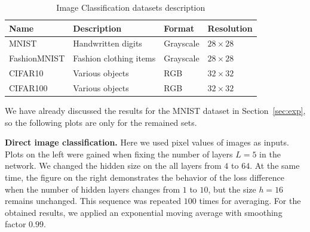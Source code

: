 \documentclass{article}
\begin{document}
\begin{table}[ht]
  \caption{Image Classification datasets description}
  \label{table:datasets}
  \centering
  \begin{tabular}{llll}
    \toprule
    Name     & Description     & Format & Resolution \\
    \midrule
    MNIST \cite{deng2012mnist} & Handwritten digits & Grayscale & $28 \times 28$ \\
    FashionMNIST \cite{xiao2017fashionmnistnovelimagedataset} & Fashion clothing items & Grayscale & $28 \times 28$ \\
    CIFAR10 \cite{krizhevsky2009learning} & Various objects & RGB & $32\times 32$ \\
    CIFAR100 \cite{krizhevsky2009learning} & Various objects & RGB & $32 \times 32$ \\
    \bottomrule
  \end{tabular}
\end{table}

We have already discussed the results for the MNIST dataset in Section~\ref{sec:exp}, so the following plots are only for the remained sets.

\textbf{Direct image classification.} Here we used pixel values of images as inputs. Plots on the left were gained when fixing the number of layers $L=5$ in the network. We changed the hidden size on the all layers from $4$ to $64$. At the same time, the figure on the right demonstrates the behavior of the loss difference when the number of hidden layers changes from $1$ to $10$, but the size $h = 16$ remains unchanged. This sequence was repeated $100$ times for averaging. For the obtained results, we applied an exponential moving average with smoothing factor $0.99$.
\end{document}

